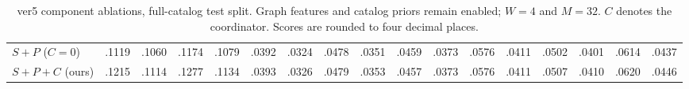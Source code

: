 \documentclass[11pt]{article}
\begin{document}
\begin{table}[!t]
{\begin{tabular}{l*{4}{rrrr}}
$S+P$ ($C=0$) & .1119 & .1060 & .1174 & .1079 & .0392 & .0324 & .0478 & .0351 & .0459 & .0373 & .0576 & .0411 & .0502 & .0401 & .0614 & .0437 \\
$S+P+C$ (ours) & .1215 & .1114 & .1277 & .1134 & .0393 & .0326 & .0479 & .0353 & .0457 & .0373 & .0576 & .0411 & .0507 & .0410 & .0620 & .0446 \\
\bottomrule
\end{tabular}%
}
\caption{ver5 component ablations, full-catalog test split. Graph features and catalog priors remain enabled; $W=4$ and $M=32$. $C$ denotes the coordinator. Scores are rounded to four decimal places.}
\label{tab:amazon2023_main}
\end{table}
\end{document}
